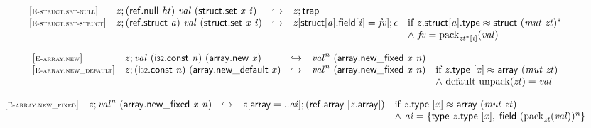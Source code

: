 \vspace{1ex}

$$
\begin{array}{@{}l@{}lcl@{}l@{}}
{[\textsc{\scriptsize E{-}struct.set{-}null}]} \quad & {\mathit{z}} ; (\mathsf{ref.null}~{\mathit{ht}})~{\mathit{val}}~(\mathsf{struct.set}~{\mathit{x}}~{\mathit{i}}) &\hookrightarrow& {\mathit{z}} ; \mathsf{trap} &  \\
{[\textsc{\scriptsize E{-}struct.set{-}struct}]} \quad & {\mathit{z}} ; (\mathsf{ref.struct}~{\mathit{a}})~{\mathit{val}}~(\mathsf{struct.set}~{\mathit{x}}~{\mathit{i}}) &\hookrightarrow& {\mathit{z}}{}[\mathsf{struct}{}[{\mathit{a}}].\mathsf{field}{}[{\mathit{i}}] = {\mathit{fv}}] ; \epsilon &\quad
  \mbox{if}~{\mathit{z}}.\mathsf{struct}{}[{\mathit{a}}].\mathsf{type} \approx \mathsf{struct}~{({\mathit{mut}}~{\mathit{zt}})^\ast} \\
 &&&&\quad {\land}~{\mathit{fv}} = {{\mathrm{pack}}}_{{{\mathit{zt}}^\ast}{}[{\mathit{i}}]}({\mathit{val}}) \\
\end{array}
$$

\vspace{1ex}

$$
\begin{array}{@{}l@{}lcl@{}l@{}}
{[\textsc{\scriptsize E{-}array.new}]} \quad & {\mathit{z}} ; {\mathit{val}}~(\mathsf{i{\scriptstyle32}}.\mathsf{const}~{\mathit{n}})~(\mathsf{array.new}~{\mathit{x}}) &\hookrightarrow& {{\mathit{val}}^{{\mathit{n}}}}~(\mathsf{array.new\_fixed}~{\mathit{x}}~{\mathit{n}}) &  \\
{[\textsc{\scriptsize E{-}array.new\_default}]} \quad & {\mathit{z}} ; (\mathsf{i{\scriptstyle32}}.\mathsf{const}~{\mathit{n}})~(\mathsf{array.new\_default}~{\mathit{x}}) &\hookrightarrow& {{\mathit{val}}^{{\mathit{n}}}}~(\mathsf{array.new\_fixed}~{\mathit{x}}~{\mathit{n}}) &\quad
  \mbox{if}~{\mathit{z}}.\mathsf{type}~{}[{\mathit{x}}] \approx \mathsf{array}~({\mathit{mut}}~{\mathit{zt}}) \\
 &&&&\quad {\land}~{\mathrm{default}}~{\mathrm{unpack}}({\mathit{zt}}) = {\mathit{val}} \\
\end{array}
$$

$$
\begin{array}{@{}l@{}lcl@{}l@{}}
{[\textsc{\scriptsize E{-}array.new\_fixed}]} \quad & {\mathit{z}} ; {{\mathit{val}}^{{\mathit{n}}}}~(\mathsf{array.new\_fixed}~{\mathit{x}}~{\mathit{n}}) &\hookrightarrow& {\mathit{z}}{}[\mathsf{array} = ..{\mathit{ai}}] ; (\mathsf{ref.array}~{|{\mathit{z}}.\mathsf{array}|}) &\quad
  \mbox{if}~{\mathit{z}}.\mathsf{type}~{}[{\mathit{x}}] \approx \mathsf{array}~({\mathit{mut}}~{\mathit{zt}}) \\
 &&&&\quad {\land}~{\mathit{ai}} = \{ \begin{array}[t]{@{}l@{}}
\mathsf{type}~{\mathit{z}}.\mathsf{type}~{}[{\mathit{x}}],\; \mathsf{field}~{({{\mathrm{pack}}}_{{\mathit{zt}}}({\mathit{val}}))^{{\mathit{n}}}} \}\end{array} \\
\end{array}
$$

